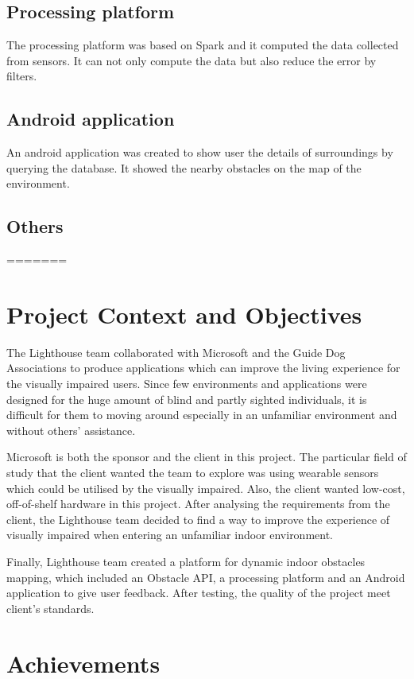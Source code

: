 \documentclass[prodmode,acmtosem]{acmsmall} %
\begin{document}
\subsection{Processing platform}
The processing platform was based on Spark and it computed the data collected from sensors. It can not only compute the data but also reduce the error by filters.
\subsection{Android application}
An android application was created to show user the details of surroundings by querying the database. It showed the nearby obstacles on the map of the environment.
\subsection{Others}
=======
\section{Project Context and Objectives}
The Lighthouse team collaborated with Microsoft and the Guide Dog Associations to produce applications which can improve the living experience for the visually impaired users. Since few environments and applications were designed for the huge amount of blind and partly sighted individuals, it is difficult for them to moving around especially in an unfamiliar environment and without others’ assistance. 

Microsoft is both the sponsor and the client in this project. The particular field of study that the client wanted the team to explore was using wearable sensors which could be utilised by the visually impaired. Also, the client wanted low-cost, off-of-shelf hardware in this project. After analysing the requirements from the client, the Lighthouse team decided to find a way to improve the experience of visually impaired when entering an unfamiliar indoor environment.

Finally, Lighthouse team created a platform for dynamic indoor obstacles mapping, which included an Obstacle API, a processing platform and an Android application to give user feedback. After testing, the quality of the project meet client's standards.

\section{Achievements}
\end{document}
